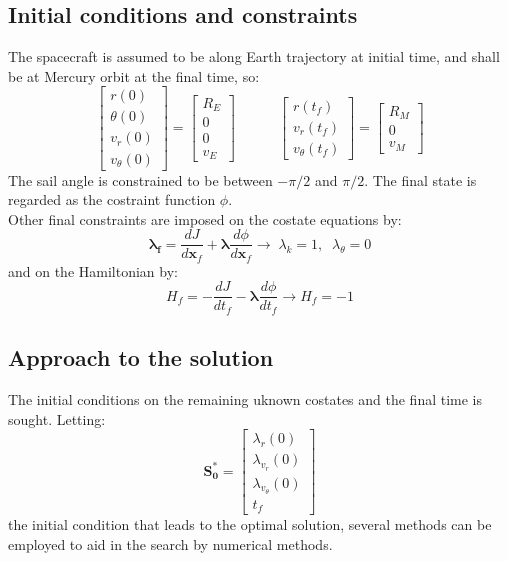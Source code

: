 \documentclass{report}
\begin{document}
\subsection*{Initial conditions and constraints}
The spacecraft is assumed to be along Earth trajectory at initial time, and shall be at Mercury orbit at the final time, 
 so:
\begin{equation*}
    \begin{bmatrix}
        r(0) \\
        \theta(0) \\
        v_r(0) \\
        v_{\theta}(0)
    \end{bmatrix}
    =
    \begin{bmatrix}
        R_E \\
        0 \\
        0 \\
        v_E
    \end{bmatrix}
    \quad \quad \quad
    \begin{bmatrix}
        r(t_f) \\

        v_r(t_f) \\
        v_{\theta}(t_f)
    \end{bmatrix}
    =
    \begin{bmatrix}
        R_M \\

        0 \\
        v_M
    \end{bmatrix}
\end{equation*}
The sail angle is constrained to be between $-\pi/2$ and $\pi/2$. The final state is regarded as the
costraint function $\phi$.\\
Other final constraints are imposed on the costate equations by:
\begin{equation*}
    \boldsymbol{\lambda_f} = \frac{dJ}{d\boldsymbol{x}_f} + \boldsymbol{\lambda}\frac{d\phi}{d\boldsymbol{x}_f}
    \rightarrow \; \lambda_k = 1,\;\; \lambda_{\theta} = 0
\end{equation*}
and on the Hamiltonian by:
\begin{equation*}
    H_f = -\frac{dJ}{dt_f} - \boldsymbol{\lambda}\frac{d\phi}{dt_f} \rightarrow H_f = - 1
\end{equation*}

\subsection*{Approach to the solution}
The initial conditions on the remaining uknown costates and the final time is sought. Letting:
\begin{equation*}
    \boldsymbol{S_0^*} = \begin{bmatrix}
        \lambda_r(0) \\
        \lambda_{v_r}(0) \\
        \lambda_{v_{\theta}}(0) \\
        t_f
    \end{bmatrix}
\end{equation*}
the initial condition that leads to the optimal solution, several methods can be employed to aid in the search by numerical methods.
\end{document}
